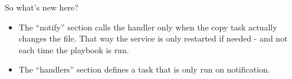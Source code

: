 \begin{Shaded}
\begin{Highlighting}[]
\PreprocessorTok{{-}{-}{-}}
\KeywordTok{{-}}\AttributeTok{ }\KeywordTok{:}
\AttributeTok{  }\KeywordTok{:}
\AttributeTok{  }\KeywordTok{:}\AttributeTok{ }
\AttributeTok{  }\KeywordTok{:}
\AttributeTok{    }\KeywordTok{{-}}\AttributeTok{ }\KeywordTok{:}
\AttributeTok{      }\KeywordTok{:}
\AttributeTok{        }\KeywordTok{:}
\AttributeTok{        }\KeywordTok{:}
\AttributeTok{        }\KeywordTok{:}\AttributeTok{ }\StringTok{\textquotesingle{}644\textquotesingle{}}
\AttributeTok{      }\KeywordTok{:}
\AttributeTok{        }\KeywordTok{{-}}
\AttributeTok{    }\KeywordTok{{-}}\AttributeTok{ }\KeywordTok{:}
\AttributeTok{      }\KeywordTok{:}
\AttributeTok{        }\KeywordTok{:}
\AttributeTok{        }\KeywordTok{:}
\AttributeTok{        }\KeywordTok{:}
\AttributeTok{        }\KeywordTok{:}
\AttributeTok{  }\KeywordTok{:}
\AttributeTok{    }\KeywordTok{{-}}\AttributeTok{ }\KeywordTok{:}
\AttributeTok{      }\KeywordTok{:}
\AttributeTok{        }\KeywordTok{:}
\AttributeTok{        }\KeywordTok{:}
\end{Highlighting}
\end{Shaded}

So what's new here?

\begin{itemize}
\tightlist
\item
  The ``notify'' section calls the handler only when the copy task
  actually changes the file. That way the service is only restarted if
  needed - and not each time the playbook is run.
\item
  The ``handlers'' section defines a task that is only run on
  notification.
\end{itemize}

